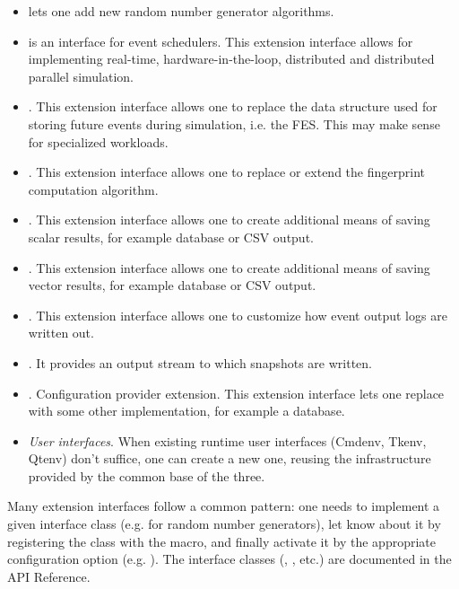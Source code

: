 \begin{itemize}
   \item {} lets one add new random number generator algorithms.
   \item {} is an interface for event schedulers.
     This extension interface allows for implementing real-time,
     hardware-in-the-loop, distributed and distributed parallel simulation.
   \item {}. This extension interface allows one to
     replace the data structure used for storing future events during
     simulation, i.e. the FES. This may make sense for specialized
     workloads.
   \item {}. This extension interface allows one
     to replace or extend the fingerprint computation algorithm.
   \item {}. This extension interface allows
     one to create additional means of saving scalar results, for example
     database or CSV output.
   \item {}. This extension interface allows
     one to create additional means of saving vector results, for example
     database or CSV output.
   \item {}. This extension interface allows one
     to customize how event output logs are written out.
   \item {}. It provides an output stream to which
     snapshots are written.
   \item {}. Configuration provider extension.
     This extension interface lets one replace 
     with some other implementation, for example a database.
   \item \textit{User interfaces}. When existing runtime user interfaces
     (Cmdenv, Tkenv, Qtenv) don't suffice, one can create a new one,
     reusing the infrastructure provided by the common base of the three.
\end{itemize}

Many extension interfaces follow a common pattern: one needs to implement a
given interface class (e.g.  for random number generators),
let {\opp} know about it by registering the class with the
 macro, and finally activate it by the appropriate
configuration option (e.g. ). The interface classes
(, , etc.) are documented in the API
Reference.

